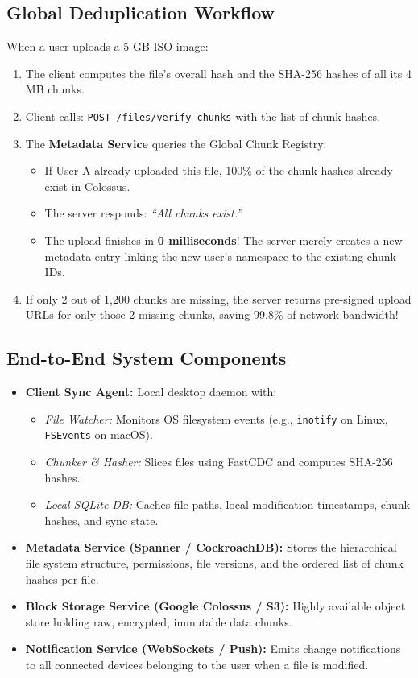 \documentclass[10pt,journal,compsoc,onecolumn]{IEEEtran}
\begin{document}
\subsection{Global Deduplication Workflow}
When a user uploads a 5 GB ISO image:
\begin{enumerate}
    \item The client computes the file's overall hash and the SHA-256 hashes of all its 4 MB chunks.
    \item Client calls: \texttt{POST /files/verify-chunks} with the list of chunk hashes.
    \item The \textbf{Metadata Service} queries the Global Chunk Registry:
    \begin{itemize}
        \item If User A already uploaded this file, 100\% of the chunk hashes already exist in Colossus.
        \item The server responds: \emph{``All chunks exist.''}
        \item The upload finishes in \textbf{0 milliseconds}! The server merely creates a new metadata entry linking the new user's namespace to the existing chunk IDs.
    \end{itemize}
    \item If only 2 out of 1,200 chunks are missing, the server returns pre-signed upload URLs for only those 2 missing chunks, saving 99.8\% of network bandwidth!
\end{enumerate}

\subsection{End-to-End System Components}
\begin{itemize}
    \item \textbf{Client Sync Agent:} Local desktop daemon with:
    \begin{itemize}
        \item \emph{File Watcher:} Monitors OS filesystem events (e.g., \texttt{inotify} on Linux, \texttt{FSEvents} on macOS).
        \item \emph{Chunker \& Hasher:} Slices files using FastCDC and computes SHA-256 hashes.
        \item \emph{Local SQLite DB:} Caches file paths, local modification timestamps, chunk hashes, and sync state.
    \end{itemize}
    \item \textbf{Metadata Service (Spanner / CockroachDB):} Stores the hierarchical file system structure, permissions, file versions, and the ordered list of chunk hashes per file.
    \item \textbf{Block Storage Service (Google Colossus / S3):} Highly available object store holding raw, encrypted, immutable data chunks.
    \item \textbf{Notification Service (WebSockets / Push):} Emits change notifications to all connected devices belonging to the user when a file is modified.
\end{itemize}
\end{document}

